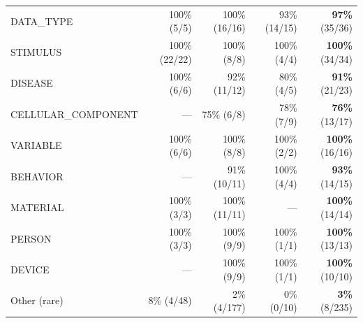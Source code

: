 \begin{table}[ht]
\begin{tabular}{lrrrr}
DATA\_TYPE & 100\% (5/5) & 100\% (16/16) & 93\% (14/15) & \textbf{97\%} (35/36) \\
STIMULUS & 100\% (22/22) & 100\% (8/8) & 100\% (4/4) & \textbf{100\%} (34/34) \\
DISEASE & 100\% (6/6) & 92\% (11/12) & 80\% (4/5) & \textbf{91\%} (21/23) \\
CELLULAR\_COMPONENT & --- & 75\% (6/8) & 78\% (7/9) & \textbf{76\%} (13/17) \\
VARIABLE & 100\% (6/6) & 100\% (8/8) & 100\% (2/2) & \textbf{100\%} (16/16) \\
BEHAVIOR & --- & 91\% (10/11) & 100\% (4/4) & \textbf{93\%} (14/15) \\
MATERIAL & 100\% (3/3) & 100\% (11/11) & --- & \textbf{100\%} (14/14) \\
PERSON & 100\% (3/3) & 100\% (9/9) & 100\% (1/1) & \textbf{100\%} (13/13) \\
DEVICE & --- & 100\% (9/9) & 100\% (1/1) & \textbf{100\%} (10/10) \\
\midrule
Other (rare) & 8\% (4/48) & 2\% (4/177) & 0\% (0/10) & \textbf{3\%} (8/235) \\
\bottomrule
\end{tabular}
\end{table}
